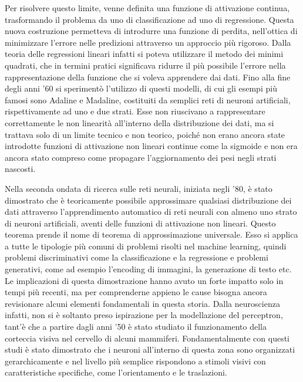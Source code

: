 \noindent Per risolvere questo limite, venne definita una funzione di attivazione continua, trasformando il problema da uno di classificazione ad uno di regressione. Questa nuova costruzione permetteva di introdurre una funzione di perdita, nell'ottica di minimizzare l'errore nelle predizioni attraverso un approccio più rigoroso. Dalla teoria delle regressioni lineari infatti si poteva utilizzare il metodo dei minimi quadrati, che in termini pratici significava ridurre il più possibile l'errore nella rappresentazione della funzione che si voleva apprendere dai dati. Fino alla fine degli anni '60 si sperimentò l'utilizzo di questi modelli, di cui gli esempi più famosi sono Adaline e Madaline, costituiti da semplici reti di neuroni artificiali, rispettivamente ad uno e due strati. Esse non riuscivano a rappresentare correttamente le non linearità all'interno della distribuzione dei dati, ma si trattava solo di un limite tecnico e non teorico, poiché non erano ancora state introdotte funzioni di attivazione non lineari continue come la sigmoide e non era ancora stato compreso come propagare l'aggiornamento dei pesi negli strati nascosti. 

\noindent Nella seconda ondata di ricerca sulle reti neurali, iniziata negli '80, è stato dimostrato che è teoricamente possibile approssimare qualsiasi distribuzione dei dati attraverso l'apprendimento automatico di reti neurali con almeno uno strato di neuroni artificiali, aventi delle funzioni di attivazione non lineari. Questo teorema prende il nome di teorema di approssimazione universale. Esso si applica a tutte le tipologie più comuni di problemi risolti nel machine learning, quindi problemi discriminativi come la classificazione e la regressione e problemi generativi, come ad esempio l'encoding di immagini, la generazione di testo etc. Le implicazioni di questa dimostrazione hanno avuto un forte impatto solo in tempi più recenti, ma per comprenderne appieno le cause bisogna ancora revisionare alcuni elementi fondamentali in questa storia. Dalla neuroscienza infatti, non si è soltanto preso ispirazione per la modellazione del perceptron, tant'è che a partire dagli anni '50 è stato studiato il funzionamento della corteccia visiva nel cervello di alcuni mammiferi. Fondamentalmente con questi studi è stato dimostrato che i neuroni all'interno di questa zona sono organizzati gerarchicamente e nel livello più semplice rispondono a stimoli visivi con caratteristiche specifiche, come l'orientamento e le traslazioni. 

